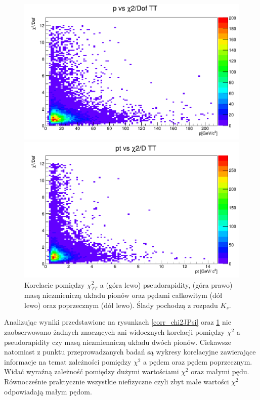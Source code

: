 \begin{figure}[H]
\vspace*{0.5cm} %
\begin{minipage}[t]{0.35\textwidth}
\includegraphics[width=\linewidth]{rozdzial6/JPsi_p_chi2TT.png}
\end{minipage}
\hspace{\fill}
\begin{minipage}[t]{0.35\textwidth}
\includegraphics[width=\linewidth]{rozdzial6/JPsi_pt_chi2TT.png}
\end{minipage}
\caption{Korelacie pomiędzy $\chi^2_{TT}$ a (góra lewo) pseudorapidity, (góra prawo) masą niezmieniczą układu pionów oraz pędami całkowitym (dół lewo) oraz poprzecznym (dół lewo). Ślady pochodzą z rozpadu $K_s$. } \label{corr_chi2JPsiTT}
\end{figure} 

Analizując wyniki przedstawione na rysunkach \ref{corr_chi2JPsi} oraz \ref{corr_chi2JPsiTT} nie zaobserwowano żadnych znaczących ani widocznych korelacji pomiędzy $\chi^2$ a pseudorapidity czy masą niezmienniczą układu dwóch pionów.  Ciekawsze natomiast z punktu przeprowadzanych badań są wykresy korelacyjne zawierające informacje na temat zależności pomiędzy $\chi^2$ a pędem oraz pędem poprzecznym. Widać wyraźną zależność pomiędzy dużymi wartościami $\chi^2$ oraz małymi pędu. Równocześnie praktycznie wszystkie niefizyczne czyli zbyt małe wartości $\chi^2$ odpowiadają małym pędom. 

